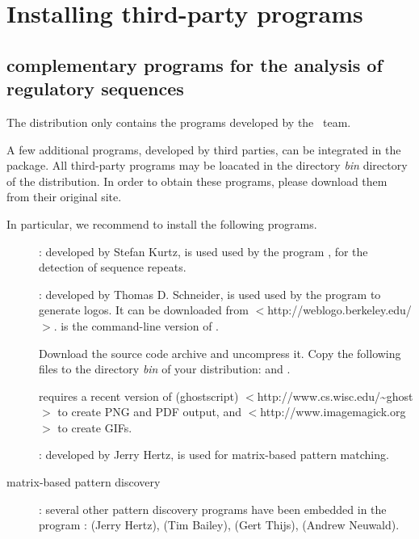 \documentclass{book}
\begin{document}



\chapter{Installing third-party programs}

\section{complementary programs for the analysis of regulatory
  sequences}

The \RSAT distribution only contains the programs developed by the
\RSAT \ team. 

A few additional programs, developed by third parties, can be
integrated in the package. All third-party programs may be loacated in
the directory \emph{bin} directory of the \RSAT distribution. In order
to obtain these programs, please download them from their original
site.

In particular, we recommend to install the following programs.

\begin{description}
\item[]: developed by Stefan Kurtz, is used used by the
program , for the detection of sequence repeats.

\item[]:  developed by Thomas D. Schneider, is used
used by the program  to generate logos. It can
be downloaded from $<$http://weblogo.berkeley.edu/$>$.  is
the command-line version of .

Download the source code archive and uncompress it. Copy the following
 files to the directory \emph{bin} of your \RSAT distribution:
 and .

 requires a recent version of  (ghostscript)
$<$http://www.cs.wisc.edu/\~{}ghost$>$ to create PNG and PDF output, and
 $<$http://www.imagemagick.org$>$ to create GIFs.

\item[]: developed by Jerry Hertz, is used for
  matrix-based pattern matching.

\item[matrix-based pattern discovery]: several other pattern discovery
  programs have been embedded in the \RSAT program
  :
 (Jerry Hertz),
 (Tim Bailey),
 (Gert Thijs),
 (Andrew Neuwald).


\end{description}
\end{document}
